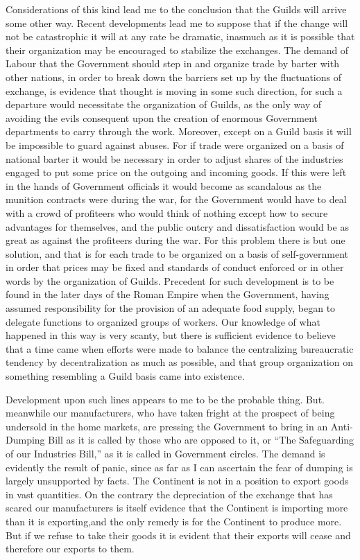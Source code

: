 \documentclass{book}
\begin{document}
Considerations of this kind lead me to the conclusion that the Guilds will arrive some other way. Recent developments lead me to suppose that if the change will not be catastrophic it will at any rate be dramatic, inasmuch as it is possible that their organization may be encouraged to stabilize the exchanges. The demand of Labour that the Government should step in and organize trade by barter with other nations, in order to break down the barriers set up by the fluctuations of exchange, is evidence that thought is moving in some such direction, for such a departure would necessitate the organization of Guilds, as the only way of avoiding the evils consequent upon the creation of enormous Government departments to carry through the work. Moreover, except on a Guild basis it will be impossible to guard against abuses. For if trade were organized on a basis of national barter it would be necessary in order to adjust shares of the industries engaged to put some price on the outgoing and incoming goods. If this were left in the hands of Government officials it would become as scandalous as the munition contracts were during the war, for the Government would have to deal with a crowd of profiteers who would think of nothing except how to secure advantages for themselves, and the public outcry and dissatisfaction would be as great as against the profiteers during the war. For this problem there is but one solution, and that is for each trade to be organized on a basis of self-government in order that prices may be fixed and standards of conduct enforced or in other words by the organization of Guilds. Precedent for such development is to be found in the later days of the Roman Empire when the Government, having assumed responsibility for the provision of an adequate food supply, began to delegate functions to organized groups of workers. Our knowledge of what happened in this way is very scanty, but there is sufficient evidence to believe that a time came when efforts were made to balance the centralizing bureaucratic tendency by decentralization as much as possible, and that group organization on something resembling a Guild basis came into existence.

Development upon such lines appears to me to be the probable thing. But. meanwhile our manufacturers, who have taken fright at the prospect of being undersold in the home markets, are pressing the Government to bring in an Anti-Dumping Bill as it is called by those who are opposed to it, or “The Safeguarding of our Industries Bill,” as it is called in Government circles. The demand is evidently the result of panic, since as far as I can ascertain the fear of dumping is largely unsupported by facts. The Continent is not in a position to export goods in vast quantities. On the contrary the depreciation of the exchange that has scared our manufacturers is itself evidence that the Continent is importing more than it is exporting,\footnotemark[1] and the only remedy is for the Continent to produce more. But if we refuse to take their goods it is evident that their exports will cease and therefore our exports to them.
\end{document}
